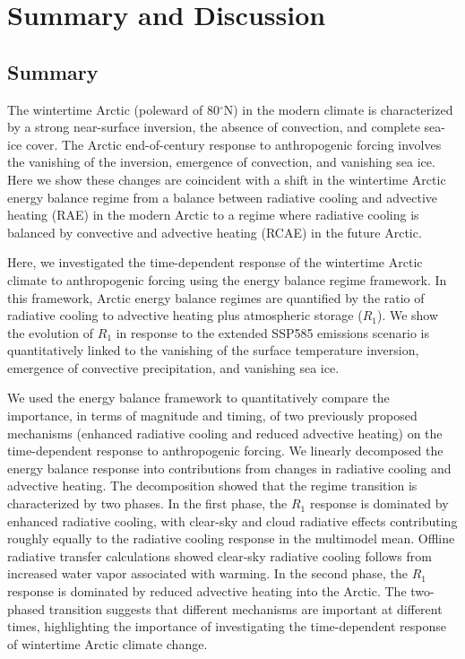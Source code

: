\documentclass[draft]{agujournal2019}
\begin{document}
\section{Summary and Discussion}
\label{sec:end}
\subsection{Summary}
The wintertime Arctic (poleward of 80$^\circ$N) in the modern climate is characterized by a strong near-surface inversion, the absence of convection, and complete sea-ice cover. The Arctic end-of-century response to anthropogenic forcing involves the vanishing of the inversion, emergence of convection, and vanishing sea ice. Here we show these changes are coincident with a shift in the wintertime Arctic energy balance regime from a balance between radiative cooling and advective heating (RAE) in the modern Arctic to a regime where radiative cooling is balanced by convective and advective heating (RCAE) in the future Arctic.

Here, we investigated the time-dependent response of the wintertime Arctic climate to anthropogenic forcing using the energy balance regime framework. In this framework, Arctic energy balance regimes are quantified by the ratio of radiative cooling to advective heating plus atmospheric storage ($R_1$). We show the evolution of $R_1$ in response to the extended SSP585 emissions scenario is quantitatively linked to the vanishing of the surface temperature inversion, emergence of convective precipitation, and vanishing sea ice.

We used the energy balance framework to quantitatively compare the importance, in terms of magnitude and timing, of two previously proposed mechanisms (enhanced radiative cooling and reduced advective heating) on the time-dependent response to anthropogenic forcing. We linearly decomposed the energy balance response into contributions from changes in radiative cooling and advective heating. The decomposition showed that the regime transition is characterized by two phases. In the first phase, the $R_1$ response is dominated by enhanced radiative cooling, with clear-sky and cloud radiative effects contributing roughly equally to the radiative cooling response in the multimodel mean. Offline radiative transfer calculations showed clear-sky radiative cooling follows from increased water vapor associated with warming. In the second phase, the $R_1$ response is dominated by reduced advective heating into the Arctic. The two-phased transition suggests that different mechanisms are important at different times, highlighting the importance of investigating the time-dependent response of wintertime Arctic climate change.
\end{document}
